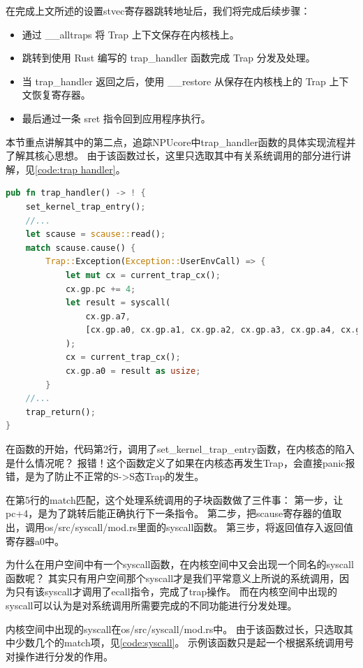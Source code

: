 在完成上文所述的设置stvec寄存器跳转地址后，我们将完成后续步骤：

\begin{itemize}
    \item 通过 __alltraps 将 Trap 上下文保存在内核栈上。
    \item 跳转到使用 Rust 编写的 trap_handler 函数完成 Trap 分发及处理。
    \item 当 trap_handler 返回之后，使用 __restore 从保存在内核栈上的 Trap 上下文恢复寄存器。
    \item 最后通过一条 sret 指令回到应用程序执行。
\end{itemize}

本节重点讲解其中的第二点，追踪NPUcore中trap_handler函数的具体实现流程并了解其核心思想。
由于该函数过长，这里只选取其中有关系统调用的部分进行讲解，见\autoref{code:trap handler}。

\begin{lstlisting}[language={Rust}, label={code:trap handler},
    caption={trap_handler}]
pub fn trap_handler() -> ! {
    set_kernel_trap_entry();
	//...
    let scause = scause::read();
    match scause.cause() {
        Trap::Exception(Exception::UserEnvCall) => {
            let mut cx = current_trap_cx();
            cx.gp.pc += 4;
            let result = syscall(
                cx.gp.a7,
                [cx.gp.a0, cx.gp.a1, cx.gp.a2, cx.gp.a3, cx.gp.a4, cx.gp.a5],
            );
            cx = current_trap_cx();
            cx.gp.a0 = result as usize;
        }
	//...
    trap_return();
}
\end{lstlisting}

在函数的开始，代码第2行，调用了set_kernel_trap_entry函数，在内核态的陷入是什么情况呢？
报错！这个函数定义了如果在内核态再发生Trap，会直接panic报错，是为了防止不正常的S->S态Trap的发生。

在第5行的match匹配，这个处理系统调用的子块函数做了三件事：
第一步，让pc+4，是为了跳转后能正确执行下一条指令。
第二步，把scause寄存器的值取出，调用os/src/syscall/mod.rs里面的syscall函数。
第三步，将返回值存入返回值寄存器a0中。

为什么在用户空间中有一个syscall函数，在内核空间中又会出现一个同名的syscall函数呢？
其实只有用户空间那个syscall才是我们平常意义上所说的系统调用，因为只有该syscall才调用了ecall指令，完成了trap操作。
而在内核空间中出现的syscall可以认为是对系统调用所需要完成的不同功能进行分发处理。

内核空间中出现的syscall在os/src/syscall/mod.rs中。
由于该函数过长，只选取其中少数几个的match项，见\autoref{code:syscall}。
示例该函数只是起一个根据系统调用号对操作进行分发的作用。

